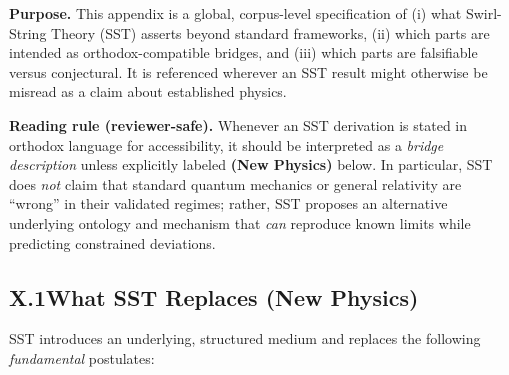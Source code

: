 \documentclass[11pt]{article}
\begin{document}
        \providecommand{\swirlarrow}{\mathchoice{\mkern-2mu\scriptstyle\boldsymbol{\circlearrowleft}}{\mkern-2mu\scriptstyle\boldsymbol{\circlearrowleft}}{\mkern-2mu\scriptscriptstyle\boldsymbol{\circlearrowleft}}{\mkern-2mu\scriptscriptstyle\boldsymbol{\circlearrowleft}}}
        \providecommand{\swirlarrowcw}{\mathchoice{\mkern-2mu\scriptstyle\boldsymbol{\circlearrowright}}{\mkern-2mu\scriptstyle\boldsymbol{\circlearrowright}}{\mkern-2mu\scriptscriptstyle\boldsymbol{\circlearrowright}}{\mkern-2mu\scriptscriptstyle\boldsymbol{\circlearrowright}}}
        \providecommand{\vswirl}{\mathbf{v}_{\swirlarrow}}
        \providecommand{\vswirlcw}{\mathbf{v}_{\swirlarrowcw}}
        \providecommand{\rhoF}{\rho_{\!f}}
        \providecommand{\rhoE}{\rho_{\!E}}
        \providecommand{\rhoM}{\rho_{\!m}}
        \providecommand{\rc}{r_c}
        \providecommand{\SwirlClock}{S_t^{\swirlarrow}}
        \providecommand{\SwirlClockcw}{S_t^{\swirlarrowcw}}

        \vspace{0.5em}
        \noindent\textbf{Purpose.}
        This appendix is a global, corpus-level specification of (i) what Swirl-String Theory (SST) asserts beyond standard frameworks, (ii) which parts are intended as orthodox-compatible bridges, and (iii) which parts are falsifiable versus conjectural. It is referenced wherever an SST result might otherwise be misread as a claim about established physics.

        \vspace{0.75em}
        \noindent\textbf{Reading rule (reviewer-safe).}
        Whenever an SST derivation is stated in orthodox language for accessibility, it should be interpreted as a \emph{bridge description} unless explicitly labeled \textbf{(New Physics)} below. In particular, SST does \emph{not} claim that standard quantum mechanics or general relativity are ``wrong'' in their validated regimes; rather, SST proposes an alternative underlying ontology and mechanism that \emph{can} reproduce known limits while predicting constrained deviations.

        \subsection*{X.1\quad What SST Replaces \textbf{(New Physics)}}
            SST introduces an underlying, structured medium and replaces the following \emph{fundamental} postulates:
\end{document}
